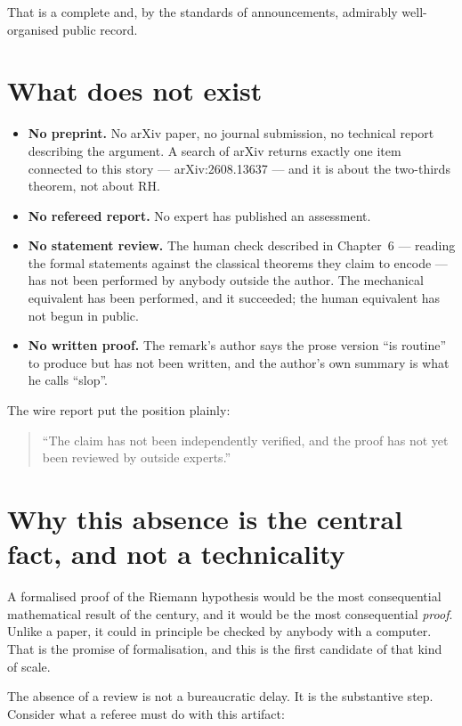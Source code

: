 That is a complete and, by the standards of announcements, admirably
well-organised public record.

\section{What does not exist}\begin{itemize}
\item \textbf{No preprint.} No arXiv paper, no journal submission, no
technical report describing the argument. A search of arXiv returns exactly
one item connected to this story --- arXiv:2608.13637 --- and it is about the
two-thirds theorem, not about RH.
\item \textbf{No refereed report.} No expert has published an assessment.
\item \textbf{No statement review.} The human check described in Chapter~6
--- reading the formal statements against the classical theorems they claim to
encode --- has not been performed by anybody outside the author. The
mechanical equivalent has been performed, and it succeeded; the human
equivalent has not begun in public.
\item \textbf{No written proof.} The remark's author says the prose version
``is routine'' to produce but has not been written, and the author's own
summary is what he calls ``slop''.
\end{itemize}

The wire report put the position plainly:

\begin{quote}
\small
``The claim has not been independently verified, and the proof has not yet been
reviewed by outside experts.''
\end{quote}

\section{Why this absence is the central fact, and not a technicality}A formalised proof of the Riemann hypothesis would be the most consequential
mathematical result of the century, and it would be the most consequential
\emph{proof}. Unlike a paper, it could in principle be checked by anybody with
a computer. That is the promise of formalisation, and this is the first
candidate of that kind of scale.

The absence of a review is not a bureaucratic delay. It is the substantive
step. Consider what a referee must do with this artifact:

